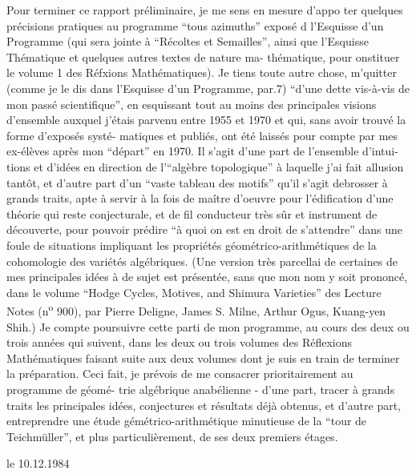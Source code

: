 Pour terminer ce rapport préliminaire,  je me sens en mesure d'appo
ter quelques précisions pratiques au programme ``tous azimuths'' exposé
d l'Esquisse d'un Programme (qui sera jointe à ``Récoltes et Semailles'',
ainsi que  l'Esquisse Thématique et quelques autres textes de nature ma-%
thématique,  pour onstituer le volume 1 des Réfxions Mathématiques).
Je tiens   toute autre chose, m'quitter (comme je le dis dans
l'Esquisse d'un Programme, par.7) ``d'une dette vis-à-vis de mon passé
scientifique'',  en esquissant tout au moins   des
principales  visions d'ensemble auxquel j'étais parvenu entre 1955
et 1970 et qui,  sans avoir trouvé  la forme d'exposés systé-%
matiques et publiés,  ont été laissés pour compte par mes ex-élèves
après mon ``départ'' en 1970.  Il s'agit d'une part de l'ensemble d'intui-%
tions et d'idées en direction de l'``algèbre topologique''\hand{,} à laquelle j'ai
fait allusion tantôt,  et d'autre part  d'un ``vaste tableau des motifs''
qu'il s'agit debrosser à grands traits,  apte à servir à la fois de
maître d'oeuvre pour l'édification d'une théorie qui reste conjecturale,
et de fil conducteur très sûr et  instrument de découverte,
pour pouvoir prédire ``à quoi on est en droit de s'attendre'' dans une
foule de situations impliquant les propriétés géométrico-arithmétiques
de la cohomologie des variétés algébriques. (Une version très parcellai
de certaines de mes principales idées à de sujet est présentée,  sans
que mon nom y soit prononcé,  dans le volume ``Hodge Cycles, Motives, and
Shimura Varieties'' des Lecture Notes (n\textsuperscript{o} 900),  par Pierre Deligne, James
S. Milne, Arthur Ogus, Kuang-yen Shih.) Je compte poursuivre cette parti
de mon programme, au cours des deux ou trois années qui suivent,  dans
les deux ou trois volumes des Réflexions Mathématiques faisant suite aux
deux volumes dont je suis en train de terminer la préparation.  Ceci
fait,  je prévois de me consacrer prioritairement au programme de géomé-%
trie algébrique anabélienne -  d'une part,  tracer à grands traits les
principales idées, conjectures et résultats déjà obtenus,  et d'autre
part,  entreprendre une étude gémétrico-arithmétique minutieuse de la
``tour de Teichmüller'',  et plus particulièrement,  de ses deux premiers
étages.

 le 10.12.1984


